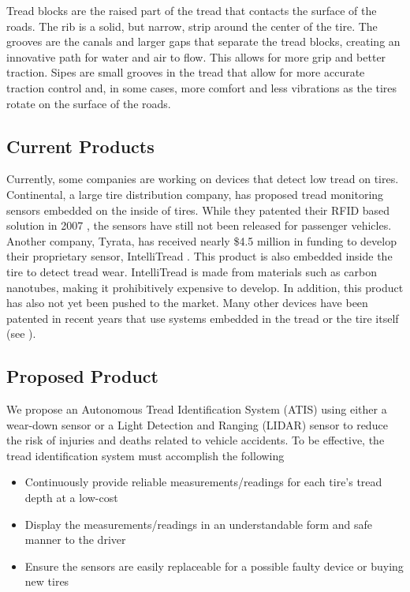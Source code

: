 \documentclass[11pt]{IEEEtran}
\begin{document}
			Tread blocks are the raised part of the tread that contacts the surface of the roads. The rib is a solid, but narrow, strip around the center of the tire. The grooves are the canals and larger gaps that separate the tread blocks, creating an innovative path for water and air to flow. This allows for more grip and better traction. Sipes are small grooves in the tread that allow for more accurate traction control and, in some cases, more comfort and less vibrations as the tires rotate on the surface of the roads. 

		\subsection{Current Products}
			Currently, some companies are working on devices that detect low tread on tires. Continental, a large tire distribution company, has proposed tread monitoring sensors embedded on the inside of tires. While they patented their RFID based solution in 2007 \cite{continentalPatent}, the sensors have still not been released for passenger vehicles. Another company, Tyrata, has received nearly \$4.5 million in funding to develop their proprietary sensor, IntelliTread \cite{intellitread}. This product is also embedded inside the tire to detect tread wear. IntelliTread is made from materials such as carbon nanotubes, making it prohibitively expensive to develop. In addition, this product has also not yet been pushed to the market. Many other devices have been patented in recent years that use systems embedded in the tread or the tire itself (see \cite{goodyearPatent1, nxpbvPatent, goodyearPatent2, patent4}).

		\subsection{Proposed Product}
			We propose an Autonomous Tread Identification System (ATIS) using either a wear-down sensor or a Light Detection and Ranging (LIDAR) sensor to reduce the risk of injuries and deaths related to vehicle accidents. To be effective, the tread identification system must accomplish the following

			\begin{itemize}
				\item Continuously provide reliable measurements/readings for each tire’s tread depth at a low-cost
				\item Display the measurements/readings in an understandable form and safe manner to the driver
				\item Ensure the sensors are easily replaceable for a possible faulty device or buying new tires 
			\end{itemize}
\end{document}
